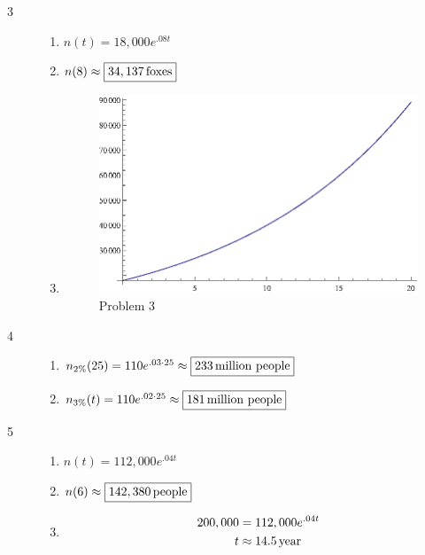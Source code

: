 \documentclass{exam}
\begin{document}
\begin{description}
      \item[3]
        \begin{enumerate}[a]
          \item $n(t) = 18,000 e^{.08t}$

          \item $n(8) \approx \boxed{ \unit[34,137]{foxes}} $

          \item
            \begin{figure}[H]
              \centering
              \includegraphics{problem3.eps}
              \caption{Problem 3}
            \end{figure}
        \end{enumerate}

      \item[4] 
        \begin{enumerate}[a]
          \item $n_{2\%}(25) = 110 e^{.03 \cdot 25} \approx \boxed{ \unit[233]{million \ people}}$

          \item $n_{3\%}(t) = 110 e^{.02\cdot 25} \approx \boxed{ \unit[181]{million \ people}}$
        \end{enumerate}

      \item[5] 
        \begin{enumerate}[a]
          \item $n(t) = 112,000 e^{.04t}$

          \item $n(6) \approx \boxed{\unit[142,380]{people}}$

          \item 
            \begin{align*}
              200,000 & = 112,000 e^{.04t} \\
              t       & \approx \unit[14.5]{year} \\
            \end{align*}


\end{enumerate}
\end{description}
\end{document}
